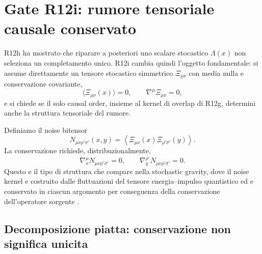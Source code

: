 \documentclass[11pt,a4paper]{article}
\begin{document}
\section{Gate R12i: rumore tensoriale causale conservato}

R12h ha mostrato che riparare a posteriori uno scalare stocastico $\Lambda(x)$ non seleziona un completamento unico. R12i cambia quindi l'oggetto fondamentale: si assume direttamente un tensore stocastico simmetrico $\Xi_{\mu\nu}$ con media nulla e conservazione covariante,
\begin{equation}
 \langle \Xi_{\mu\nu}(x)\rangle=0,
 \qquad
 \nabla^\mu\Xi_{\mu\nu}=0,
 \label{eq:r12i_source}
\end{equation}
e si chiede se il solo causal order, insieme al kernel di overlap di R12g, determini anche la struttura tensoriale del rumore.

Definiamo il noise bitensor
\begin{equation}
 N_{\mu\nu\rho'\sigma'}(x,y)
 =\left\langle\Xi_{\mu\nu}(x)\Xi_{\rho'\sigma'}(y)\right\rangle.
 \label{eq:r12i_noise_kernel}
\end{equation}
La conservazione richiede, distribuzionalmente,
\begin{equation}
 \boxed{
 \nabla_x^\mu N_{\mu\nu\rho'\sigma'}=0,
 \qquad
 \nabla_y^{\rho'}N_{\mu\nu\rho'\sigma'}=0.
 }
 \label{eq:r12i_noise_conservation}
\end{equation}
Questo e il tipo di struttura che compare nella stochastic gravity, dove il noise kernel e costruito dalle fluttuazioni del tensore energia--impulso quantistico ed e conservato in ciascun argomento per conseguenza della conservazione dell'operatore sorgente \cite{HuVerdaguer2008}.

\subsection{Decomposizione piatta: conservazione non significa unicita}
\end{document}
